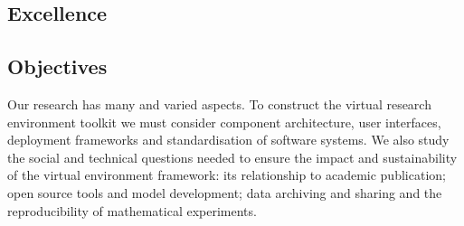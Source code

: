 \documentclass[noworkareas,deliverables,\classoptions]{euproposal}       %
\begin{document}
\begin{proposal}

\section{Excellence}



\subsection{Objectives}
\label{sect:objectives}


Our research has many and varied aspects. To
construct the \TheProject virtual research environment toolkit we must
consider component architecture, user interfaces, deployment
frameworks and standardisation of software systems.  We also study
the social and technical questions needed to ensure the impact and sustainability of the
virtual environment framework: its relationship to academic publication; open source
tools and model development; data archiving and sharing and the reproducibility of
mathematical experiments.


\end{proposal}
\end{document}
